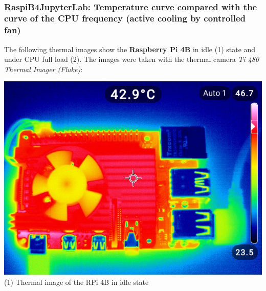 \documentclass [oneside,10pt,a4paper,ngerman,BCOR10mm,headsepline,parindent,final]{scrartcl}
\begin{document}
    \begin{center}
    \end{center}
    { \hspace*{\fill} \\}
    
    \hypertarget{raspib4jupyterlab-temperature-curve-compared-with-the-curve-of-the-cpu-frequency-active-cooling-by-controlled-fan}{%
\subsubsection{RaspiB4JupyterLab: Temperature curve compared with the
curve of the CPU frequency (active cooling by controlled
fan)}\label{raspib4jupyterlab-temperature-curve-compared-with-the-curve-of-the-cpu-frequency-active-cooling-by-controlled-fan}}

The following thermal images show the \textbf{Raspberry Pi 4B} in idle
(1) state and under CPU full load (2). The images were taken with the
thermal camera \emph{Ti 480 Thermal Imager (Fluke)}:

\includegraphics{images/thermal_images/RPi4_thermalImage_idleMode_wHeatSinkAndCtrlFan5V.jpg}\\
(1) Thermal image of the RPi 4B in idle state
\end{document}
